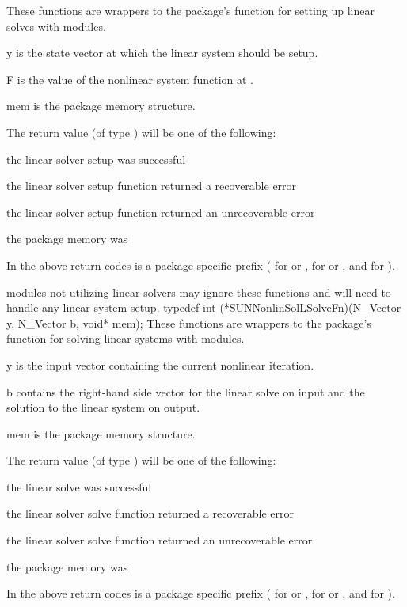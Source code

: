 {
  These functions are wrappers to the {\sundials} package's function
  for setting up linear solves with {\sunlinsol} modules.
}
{
  \begin{args}[mem]
  \item[y]
    is the state vector at which the linear system should be setup.
  \item[F]
    is the value of the nonlinear system function at .
  \item[mem]
    is the {\sundials} package memory structure.
  \end{args}
}
{
  The return value  (of type ) will be one of the
  following:
  \begin{args}
  \item[\id{*\_SUCCESS}]
    the linear solver setup was successful
  \item[\id{*\_LSETUP\_RECVR}]
    the linear solver setup function returned a recoverable error
  \item[\id{*\_LSETUP\_FAIL}]
    the linear solver setup function returned an unrecoverable error
  \item[\id{*\_MEM\_NULL}]
    the {\sundials} package memory was 
  \end{args}
  In the above return codes \id{*} is a {\sundials} package specific
  prefix ( for {\cvode} or {\cvodes},  for {\ida} or
  {\idas}, and  for {\arkode}).
}
{
  {\sunnonlinsol} modules not utilizing {\sunlinsol} linear solvers
  may ignore these functions and will need to handle any linear system
  setup.
}
{
  typedef int (*SUNNonlinSolLSolveFn)(N\_Vector y, N\_Vector b, void* mem);
}
{
  These functions are wrappers to the {\sundials} package's function
  for solving linear systems with {\sunlinsol} modules.
}
{
  \begin{args}[mem]
  \item[y]
    is the input vector containing the current nonlinear iteration.
  \item[b]
    contains the right-hand side vector for the linear solve on input
    and the solution to the linear system on output.
  \item[mem]
    is the {\sundials} package memory structure.
  \end{args}
}
{
  The return value  (of type ) will be one of the
  following:
  \begin{args}
  \item[\id{*\_SUCCESS}]
    the linear solve was successful
  \item[\id{*\_LSOLVE\_RECVR}]
    the linear solver solve function returned a recoverable error
  \item[\id{*\_LSOLVE\_FAIL}]
    the linear solver solve function returned an unrecoverable error
  \item[\id{*\_MEM\_NULL}]
    the {\sundials} package memory was 
  \end{args}
  In the above return codes \id{*} is a {\sundials} package specific
  prefix ( for {\cvode} or {\cvodes},  for {\ida} or
  {\idas}, and  for {\arkode}).
}
